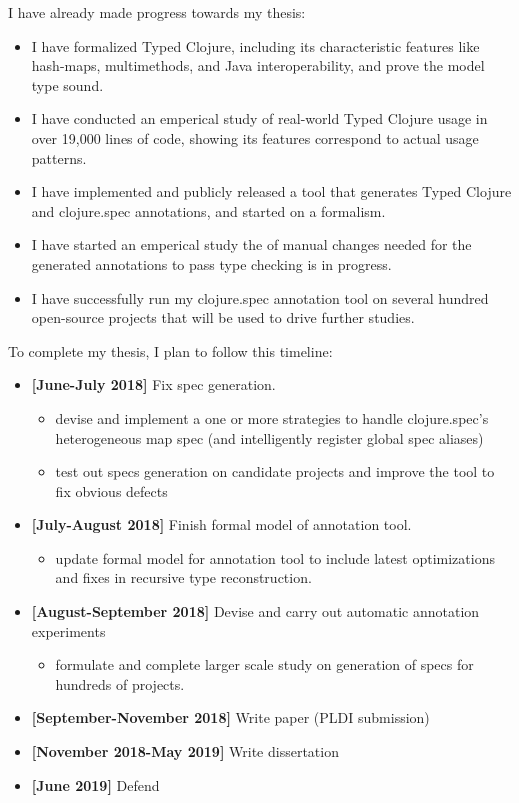 \documentclass[9pt]{extarticle}
\begin{document}
I have already made progress towards my thesis:

\begin{itemize}
  \item I have formalized Typed Clojure, including
    its characteristic features like hash-maps, multimethods, and Java interoperability,
    and prove the model type sound.
  \item I have conducted an emperical study of real-world Typed Clojure usage
    in over 19,000 lines of code, showing its features correspond to actual usage patterns.
  \item I have implemented and publicly released a tool that generates
    Typed Clojure and clojure.spec annotations, and started on a formalism.
  \item I have started an emperical study the of manual changes needed for the generated annotations
    to pass type checking is in progress.
  \item I have successfully run my clojure.spec annotation tool on several hundred open-source projects that
    will be used to drive further studies.
\end{itemize}

To complete my thesis, I plan to follow this timeline:

\begin{itemize}
  \item \textbf{[June-July 2018]} Fix spec generation.
    \begin{itemize}
      \item devise and implement a one or more strategies to handle clojure.spec's
        heterogeneous map spec (and intelligently register global spec aliases)
      \item test out specs generation on candidate projects and improve the tool to fix obvious
        defects
    \end{itemize}
  \item \textbf{[July-August 2018]} Finish formal model of annotation tool.
    \begin{itemize}
      \item update formal model for annotation tool to include latest
        optimizations and fixes in recursive type reconstruction.
    \end{itemize}
  \item \textbf{[August-September 2018]} Devise and carry out automatic annotation experiments
    \begin{itemize}
      \item formulate and complete larger scale study on generation of specs for hundreds of projects.
    \end{itemize}
  \item \textbf{[September-November 2018]} Write paper (PLDI submission)
  \item \textbf{[November 2018-May 2019]} Write dissertation
  \item \textbf{[June 2019]} Defend
\end{itemize}
\end{document}

